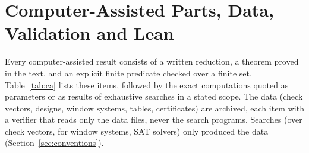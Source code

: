 %
%
%
%
%
\section{Computer-Assisted Parts, Data, Validation and Lean}\label{app:cert}
Every computer-assisted result consists of a written reduction, a theorem proved in the text, and an explicit finite predicate checked over a finite set. Table~\ref{tab:ca} lists these items, followed by the exact computations quoted as parameters or as results of exhaustive searches in a stated scope. The data (check vectors, designs, window systems, tables, certificates) are archived, each item with a verifier that reads only the data files, never the search programs. Searches (over check vectors, for window systems, SAT solvers) only produced the data (Section~\ref{sec:conventions}).

